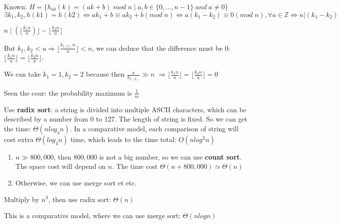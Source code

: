 \documentclass[12pt,twoside]{article}
\begin{document}
\begin{problems}
\begin{problemparts}
\end{problemparts}

\problem  %

\begin{problemparts}
\problempart %
Known: $H = \{h_{ab}(k) = (ak + b)\;mod\;n\;|\;a, b \in  \{0,...,n-1\}\;and\;a\ne0\}$
$$
\exists k_1,k_2, h(k1)=h(k2)\Leftrightarrow ak_1+b\equiv ak_2+b(mod\;n)
\Leftrightarrow a(k_1-k_2)\equiv 0(mod\;n),\forall a \in \mathbb{Z} 
\Leftrightarrow n | (k_1-k_2)
$$

\problempart %
$n\;|\;(\lfloor\frac{k_1n}{u})\rfloor-\lfloor\frac{k_2n}{u}\rfloor$

But $k_1,k_2<u\Rightarrow \lfloor\frac{k_{1(2)}n}{u}\rfloor<n$, we can deduce that
the difference must be 0: $\lfloor\frac{k_1n}{u}\rfloor=\lfloor\frac{k_2n}{u}\rfloor$.

We can take $k_1=1,k_2=2$ because then $\frac{u}{k_{1(2)}}\gg n$
$\Rightarrow \lfloor\frac{k_1n}{u}\rfloor=\lfloor\frac{k_2n}{u}\rfloor=0$

\problempart %
Seen the cour: the probability maximum is $\frac{1}{m}$

\end{problemparts}

\newpage

\problem  %

\begin{problemparts}
\problempart %
Use \textbf{radix sort}: a string is divided into multiple ASCII characters, which can be
described by a number from 0 to 127. The length of string is fixed. So we can get
the time: $\Theta(nlog_4n)$. In a comparative model, each comparison of string will
cost extra $\Theta(log_4n)$ time, which leads to the time total: $O(nlog^2n)$

\problempart %
\begin{enumerate}
    \item $n \gg 800,000$, then
    $800,000$ is not a big number, so we can use \textbf{count sort}. The space cost will depend 
    on $n$. The time cost $\Theta(n+800,000)\simeq \Theta(n)$
    \item Otherwise, we can use merge sort et etc.
\end{enumerate}

\problempart %
Multiply by $n^3$, then use radix sort: $\Theta(n)$

\problempart %
This is a comparative model, where we can use merge sort: $\Theta(nlogn)$


\end{problemparts}
\end{problems}
\end{document}
